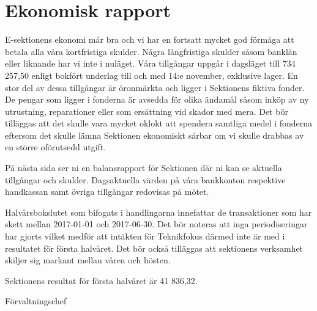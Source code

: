 \documentclass[../_main/handlingar.tex]{subfiles}
\begin{document}
\section{Ekonomisk rapport}
E-sektionens ekonomi mår bra och vi har en fortsatt mycket god förmåga att betala alla våra kortfristiga skulder. Några långfristiga skulder såsom banklån eller liknande har vi inte i nuläget. Våra tillgångar uppgår i dagsläget till 734 257,50 enligt bokfört underlag till och med 14:e november, exklusive lager. En stor del av dessa tillgångar är öronmärkta och ligger i Sektionens fiktiva fonder. De pengar som ligger i fonderna är avsedda för olika ändamål såsom inköp av ny utrustning, reparationer eller som ersättning vid skador med mera. Det bör tilläggas att det skulle vara mycket oklokt att spendera samtliga medel i fonderna eftersom det skulle lämna Sektionen ekonomiskt sårbar om vi skulle drabbas av en större oförutsedd utgift.

På nästa sida ser ni en balansrapport för Sektionen där ni kan se aktuella tillgångar och skulder. Dagsaktuella värden på våra bankkonton respektive handkassan samt övriga tillgångar redovisas på mötet.

Halvårsbokslutet som bifogats i handlingarna innefattar de transaktioner som har skett mellan 2017-01-01 och 2017-06-30. Det bör noteras att inga periodiseringar har gjorts vilket medför att intäkten för Teknikfokus därmed inte är med i resultatet för första halvåret. Det bör också tilläggas att sektionens verksamhet skiljer sig markant mellan våren och hösten.

Sektionens resultat för första halvåret är 41 836,32.
\begin{signatures}{1}
    \mvh
    \signature{Sophia Grimmeiss Grahm}{Förvaltningschef}
\end{signatures}
\end{document}
